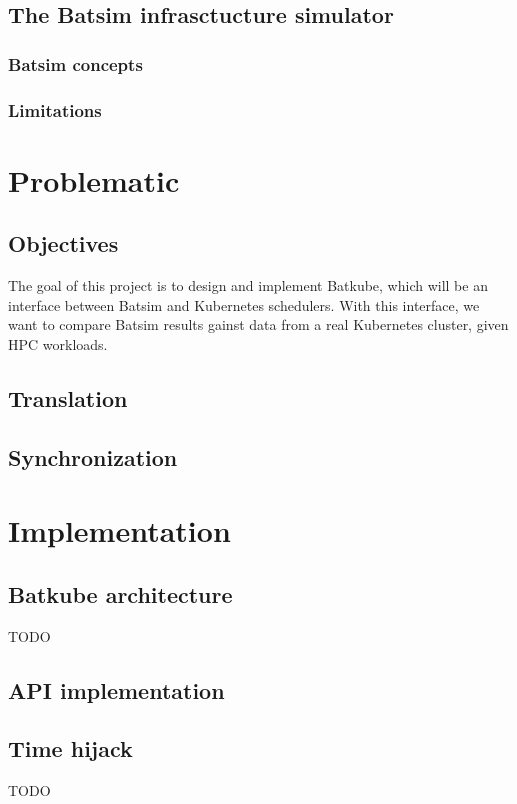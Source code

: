 \documentclass[12pt]{report}
\begin{document}
\section{The Batsim infrasctucture simulator}
\subsection{Batsim concepts}

\subsection{Limitations}


\chapter{Problematic}

\section{Objectives}

The goal of this project is to design and implement Batkube, which will be an
interface between Batsim and Kubernetes schedulers. With this interface, we
want to compare Batsim results gainst data from a real Kubernetes cluster,
given HPC workloads.

\section{Translation}

\section{Synchronization}

\chapter{Implementation}

\section{Batkube architecture}
TODO

\section{API implementation}
\section{Time hijack}
TODO
\end{document}
